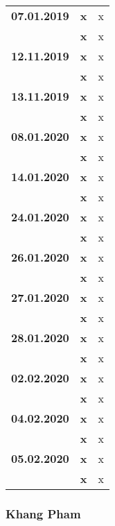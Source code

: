 {\begin{longtable}{|l|l|p{11cm}|}
		\hline \textbf{07.01.2019}
			& \textbf{\hfill x} & x \\\cline{2-3}
			& \textbf{\hfill x} & x
		\\ 
		\hline \textbf{12.11.2019}
			& \textbf{\hfill x} &x \\\cline{2-3}
			& \textbf{\hfill x} & x
		\\ 
		\hline \textbf{13.11.2019}
			& \textbf{\hfill x} & x \\\cline{2-3}	
			& \textbf{\hfill x} & x
		\\ 
		\hline \textbf{08.01.2020}
			& \textbf{\hfill x} & x \\\cline{2-3}
			& \textbf{\hfill x} & x
		\\ 
		\hline \textbf{14.01.2020}
			& \textbf{\hfill x} & x \\\cline{2-3}
			& \textbf{\hfill x} & x
		\\ 
		\hline \textbf{24.01.2020}
			& \textbf{\hfill x} & x \\\cline{2-3}
			& \textbf{\hfill x} & x
		\\ 
		\hline \textbf{26.01.2020}
			& \textbf{\hfill x} & x \\\cline{2-3}
			& \textbf{\hfill x} & x
		\\ 
		\hline \textbf{27.01.2020}
			& \textbf{\hfill x} & x \\\cline{2-3}
			& \textbf{\hfill x} & x
		\\ 
		\hline \textbf{28.01.2020}
			& \textbf{\hfill x} & x \\\cline{2-3}
			& \textbf{\hfill x} & x
		\\ 
		\hline \textbf{02.02.2020}
			& \textbf{\hfill x} & x \\\cline{2-3}
			& \textbf{\hfill x} & x
		\\ 
		\hline \textbf{04.02.2020}
			& \textbf{\hfill x} & x \\\cline{2-3}
			& \textbf{\hfill x} & x
		\\ 
		\hline \textbf{05.02.2020}
			& \textbf{\hfill x} & x \\\cline{2-3}
			& \textbf{\hfill x} & x \\
		\hline\hline
	\end{longtable}
}

\clearpage

\subsubsection{Khang Pham}

